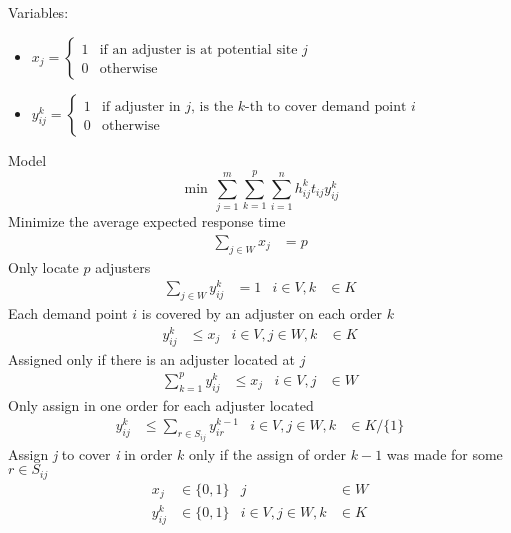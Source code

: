 Variables:
\begin{itemize}
\item $x_j =
  \begin{cases} 
    1 & \mbox{if an adjuster is at potential site } j \\
    0 & \mbox{otherwise}
  \end{cases}$
\item $y_{ij}^{k} =
  \begin{cases} 
    1 & \mbox{if adjuster in } j \mbox{, is the }
    k\mbox{-th to cover demand point } i \\
    0 & \mbox{otherwise}
  \end{cases}$
\end{itemize}

Model
{\small
  \begin{equation}
    \min \, \sum_{j=1}^{m}{
      \sum_{k=1}^{p}{
        \sum_{i=1}^{n}{
          h_{ij}^{k}t_{ij}y_{ij}^{k}
        }
      }
    }
  \end{equation}
}
Minimize the average expected response time
\begin{align}
  \label{eq:2}
  \sum_{j \in W}{x_j}
  & = p
\end{align}
Only locate $p$ adjusters
\begin{align}
  \label{eq:3}
  \sum_{j \in W}{y_{ij}^{k}}
  & = 1
  & i \in V, k
  &\in K
\end{align}
Each demand point $i$ is covered by an adjuster on each order $k$
\begin{align}
  \label{eq:4}
  y_{ij}^{k}
  & \leq x_j
  & i \in V,j \in W, k
  &\in K
\end{align}
Assigned only if there is an adjuster located at $j$
\begin{align}
  \label{eq:5}
  \sum_{k = 1}^{p}{
    y_{ij}^{k}
  }
  & \leq x_j
  & i \in V, j 
  & \in W
\end{align}
Only assign in one order for each adjuster located 
\begin{align}
  y_{ij}^{k} 
  & \leq \sum_{r\in S_{ij}}{y_{ir}^{k-1}}
  & i \in V,j \in W, k
  & \in K/\{1\}
\end{align}
Assign \textit{j} to cover \textit{i} in order $k$
only if
the assign of order $k-1$
was made for some $r \in S_{ij}$
\begin{align}
  x_{j}
  & \in \{0,1\}
  & j 
  & \in W \nonumber
  \\
  y_{ij}^{k}
  & \in \{0,1\}
  &  i \in V,j \in W,k
  &\in K \nonumber
\end{align}

%

